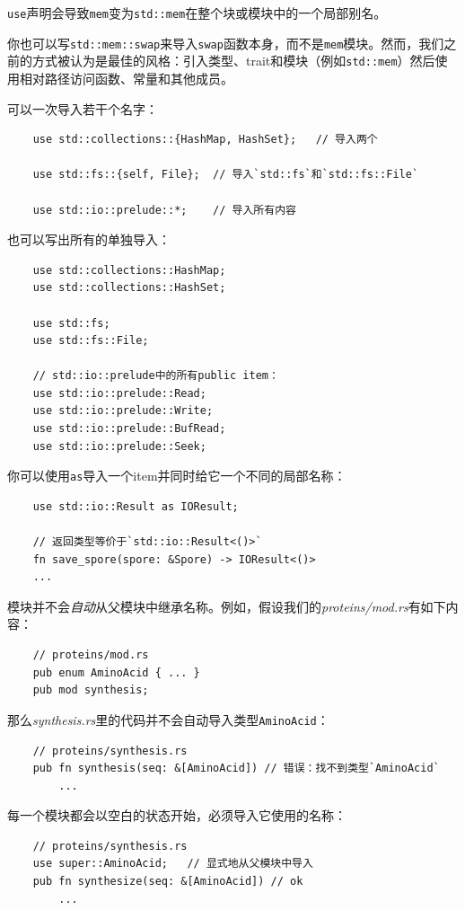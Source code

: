 \texttt{use}声明会导致\texttt{mem}变为\texttt{std::mem}在整个块或模块中的一个局部别名。

你也可以写\texttt{std::mem::swap}来导入\texttt{swap}函数本身，而不是\texttt{mem}模块。然而，我们之前的方式被认为是最佳的风格：引入类型、trait和模块（例如\texttt{std::mem}）然后使用相对路径访问函数、常量和其他成员。

可以一次导入若干个名字：
\begin{verbatim}
    use std::collections::{HashMap, HashSet};   // 导入两个
    
    use std::fs::{self, File};  // 导入`std::fs`和`std::fs::File`
    
    use std::io::prelude::*;    // 导入所有内容
\end{verbatim}

也可以写出所有的单独导入：
\begin{verbatim}
    use std::collections::HashMap;
    use std::collections::HashSet;

    use std::fs;
    use std::fs::File;

    // std::io::prelude中的所有public item：
    use std::io::prelude::Read;
    use std::io::prelude::Write;
    use std::io::prelude::BufRead;
    use std::io::prelude::Seek;
\end{verbatim}

你可以使用\texttt{as}导入一个item并同时给它一个不同的局部名称：
\begin{verbatim}
    use std::io::Result as IOResult;

    // 返回类型等价于`std::io::Result<()>`
    fn save_spore(spore: &Spore) -> IOResult<()>
    ...
\end{verbatim}

模块并不会\emph{自动}从父模块中继承名称。例如，假设我们的\emph{proteins/mod.rs}有如下内容：
\begin{verbatim}
    // proteins/mod.rs
    pub enum AminoAcid { ... }
    pub mod synthesis;
\end{verbatim}

那么\emph{synthesis.rs}里的代码并不会自动导入类型\texttt{AminoAcid}：
\begin{verbatim}
    // proteins/synthesis.rs
    pub fn synthesis(seq: &[AminoAcid]) // 错误：找不到类型`AminoAcid`
        ...
\end{verbatim}

每一个模块都会以空白的状态开始，必须导入它使用的名称：
\begin{verbatim}
    // proteins/synthesis.rs
    use super::AminoAcid;   // 显式地从父模块中导入
    pub fn synthesize(seq: &[AminoAcid]) // ok
        ...
\end{verbatim}

